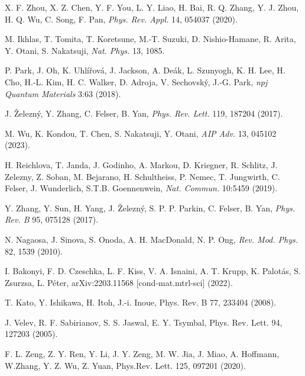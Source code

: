 \documentclass[prb,showpacs,amsmath,amssymb,superscriptaddress,twocolumn,floatfix]{revtex4-1}
\begin{document}
\begin{thebibliography}{99}
 X. F. Zhou, X. Z. Chen, Y. F. You, L. Y. Liao, H. Bai, R. Q. Zhang, Y. J. Zhou, H. Q. Wu, C. Song, F. Pan, \textit{Phys. Rev. Appl.} 14, 054037 (2020). %

 M. Ikhlas, T. Tomita, T. Koretsune, M.-T. Suzuki, D. Nishio-Hamane, R. Arita, Y. Otani, S. Nakatsuji, \textit{Nat. Phys.} 13, 1085. %

 P. Park, J. Oh, K. Uhl\'i\v{r}ov\'a, J. Jackson, A. De\'ak, L. Szunyogh, K. H. Lee, H. Cho, H.-L. Kim, H. C. Walker, D. Adroja, V. Sechovsk\'y, J.-G. Park, \textit{npj Quantum Materials} 3:63 (2018). %

 J. \v{Z}elezn\'y, Y. Zhang, C. Felser, B. Yan, \textit{Phys. Rev. Lett.} 119, 187204 (2017). %

 M. Wu, K. Kondou, T. Chen, S. Nakatsuji, Y. Otani, \textit{AIP Adv.} 13, 045102 (2023). %

 H. Reichlova, T. Janda, J. Godinho, A. Markou, D. Kriegner, R. Schlitz, J. Zelezny, Z. Soban, M. Bejarano, H. Schultheiss, P. Nemec, T. Jungwirth, C. Felser, J. Wunderlich,  S.T.B. Goennenwein, \textit{Nat. Commun.} 10:5459 (2019). %

 Y. Zhang, Y. Sun, H. Yang, J. \v{Z}elezn\'y, S. P. P. Parkin, C. Felser, B. Yan, \textit{Phys. Rev. B} 95, 075128 (2017). %

 N. Nagaosa, J. Sinova, S. Onoda, A. H. MacDonald, N. P. Ong, \textit{Rev. Mod. Phys.} 82, 1539 (2010). %
    
 I. Bakonyi, F. D. Czeschka, L. F. Kiss, V. A. Isnaini, A. T. Krupp, K. Palot\'as, S. Zsurzsa, L. P\'eter, arXiv:2203.11568 [cond-mat.mtrl-sci] (2022). %

 T. Kato, Y. Ishikawa, H. Itoh, J.-i. Inoue, Phys. Rev. B 77, 233404 (2008). %

 J. Velev, R. F. Sabirianov, S. S. Jaswal, E. Y. Tsymbal, Phys. Rev. Lett. 94, 127203 (2005). %

 F. L. Zeng, Z. Y. Ren, Y. Li, J. Y. Zeng, M. W. Jia, J. Miao, A. Hoffmann, W.Zhang, Y. Z. Wu, Z. Yuan, Phys.Rev. Lett. 125, 097201 (2020). %


\end{thebibliography}
\end{document}
